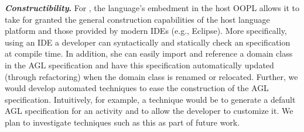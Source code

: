 \label{sect:eval-construct}
\textbf{\textit{Constructibility}.} For \agl, the language's embedment in the host OOPL allows it to take for granted the general construction capabilities of the host language platform and those provided by modern IDEs (e.g., Eclipse). More specifically, using an IDE a developer can syntactically and statically check an \agl specification at compile time. In addition, she can easily import and reference a domain class in the AGL specification and have this specification automatically updated (through refactoring) when the domain class is renamed or relocated.
%
%
Further, we would develop automated techniques to ease the construction of the AGL specification. Intuitively, for example, a technique would be to generate a default AGL specification for an activity and to allow the developer to customize it. We plan to investigate techniques such as this as part of future work.


